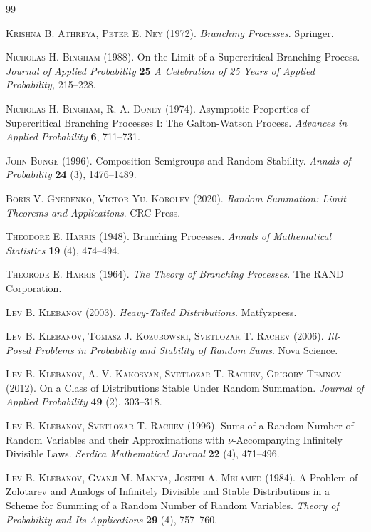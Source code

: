 \documentclass[12pt]{amsart}
\theoremstyle{remark}
\theoremstyle{definition}
\begin{document}
\begin{thebibliography}{99}

 \textsc{Krishna B. Athreya, Peter E. Ney} (1972). \textit{Branching Processes}. Springer. 

 \textsc{Nicholas H. Bingham} (1988). On the Limit of a Supercritical Branching Process. \textit{Journal of Applied Probability} \textbf{25} {\it A Celebration of 25 Years of Applied Probability,} 215--228.

 \textsc{Nicholas H. Bingham, R. A. Doney} (1974). Asymptotic Properties of Supercritical Branching Processes I: The Galton-Watson Process. {\it Advances in Applied Probability} \textbf{6}, 711--731. 

 \textsc{John Bunge} (1996). Composition Semigroups and Random Stability. \textit{Annals of Probability} \textbf{24} (3), 1476--1489. 

 \textsc{Boris V. Gnedenko, Victor Yu. Korolev} (2020). \textit{Random Summation: Limit Theorems and Applications}. CRC Press.

 \textsc{Theodore E. Harris} (1948). Branching Processes. \textit{Annals of Mathematical Statistics} \textbf{19} (4), 474--494.

 \textsc{Theorode E. Harris} (1964). \textit{The Theory of Branching Processes}. The RAND Corporation. 

 \textsc{Lev B. Klebanov} (2003). \textit{Heavy-Tailed Distributions.} Matfyzpress. 

 \textsc{Lev B. Klebanov, Tomasz J. Kozubowski, Svetlozar T. Rachev} (2006). \textit{Ill-Posed Problems in Probability and Stability of Random Sums}. Nova Science.

 \textsc{Lev B. Klebanov, A. V. Kakosyan, Svetlozar T. Rachev, Grigory Temnov} (2012). On a Class of Distributions Stable Under Random Summation. \textit{Journal of Applied Probability} \textbf{49} (2), 303--318.  

 \textsc{Lev B. Klebanov, Svetlozar T. Rachev} (1996). Sums of a Random Number of Random Variables and their Approximations with $\nu$-Accompanying Infinitely Divisible Laws. \textit{Serdica Mathematical Journal} \textbf{22} (4), 471--496.

 \textsc{Lev B. Klebanov, Gvanji M. Maniya, Joseph A. Melamed} (1984). A Problem of Zolotarev and Analogs of Infinitely Divisible and Stable Distributions in a Scheme for Summing of a Random Number of Random Variables. {\it Theory of Probability and Its Applications} \textbf{29} (4), 757--760. 


\end{thebibliography}
\end{document}
